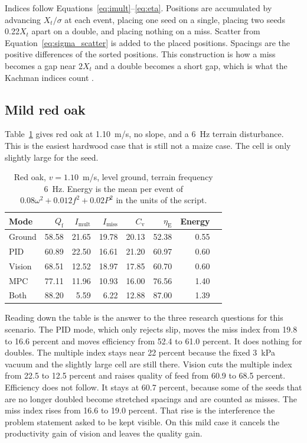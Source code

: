 Indices follow Equations~\eqref{eq:imult}--\eqref{eq:eta}. Positions are accumulated by advancing $X_t/\sigma$ at each event, placing one seed on a single, placing two seeds 0.22$X_t$ apart on a double, and placing nothing on a miss. Scatter from Equation~\eqref{eq:sigma_scatter} is added to the placed positions. Spacings are the positive differences of the sorted positions. This construction is how a miss becomes a gap near $2X_t$ and a double becomes a short gap, which is what the Kachman indices count \cite{kachman1995,iso7256}.

\subsection{Mild red oak}

Table~\ref{tab:redmild} gives red oak at 1.10~m/s, no slope, and a 6~Hz terrain disturbance. This is the easiest hardwood case that is still not a maize case. The cell is only slightly large for the seed.

\begin{table}[htbp]
\centering
\caption{Red oak, $v=1.10$~m/s, level ground, terrain frequency 6~Hz. Energy is the mean per event of $0.08\omega^2+0.012 f^2+0.02 P^2$ in the units of the script.}
\label{tab:redmild}
\begin{tabular}{@{}lrrrrrrr@{}}
\toprule
Mode & $Q_{\mathrm{f}}$ & $I_{\mathrm{mult}}$ & $I_{\mathrm{miss}}$ & $C_{\mathrm{v}}$ & $\eta_{\mathrm{E}}$ & Energy \\
\midrule
Ground & 58.58 & 21.65 & 19.78 & 20.13 & 52.38 & 0.55 \\
PID & 60.89 & 22.50 & 16.61 & 21.20 & 60.97 & 0.60 \\
Vision & 68.51 & 12.52 & 18.97 & 17.85 & 60.70 & 0.60 \\
MPC & 77.11 & 11.96 & 10.93 & 16.00 & 76.56 & 1.40 \\
Both & 88.20 & 5.59 & 6.22 & 12.88 & 87.00 & 1.39 \\
\bottomrule
\end{tabular}
\end{table}

Reading down the table is the answer to the three research questions for this scenario. The PID mode, which only rejects slip, moves the miss index from 19.8 to 16.6 percent and moves efficiency from 52.4 to 61.0 percent. It does nothing for doubles. The multiple index stays near 22 percent because the fixed 3~kPa vacuum and the slightly large cell are still there. Vision cuts the multiple index from 22.5 to 12.5 percent and raises quality of feed from 60.9 to 68.5 percent. Efficiency does not follow. It stays at 60.7 percent, because some of the seeds that are no longer doubled become stretched spacings and are counted as misses. The miss index rises from 16.6 to 19.0 percent. That rise is the interference the problem statement asked to be kept visible. On this mild case it cancels the productivity gain of vision and leaves the quality gain.

